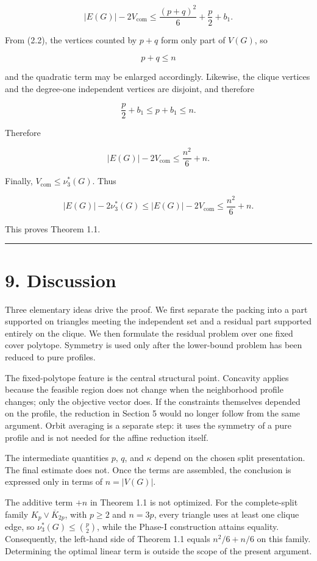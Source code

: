 \documentclass[
  11pt,
]{article}
\begin{document}
\[
|E(G)|-2V_{\mathrm{com}}
\le
\frac{(p+q)^2}{6}+\frac p2+b_1.
\tag{8.3}
\]

From (2.2), the vertices counted by \(p+q\) form only part of \(V(G)\),
so

\[
p+q\le n
\]

and the quadratic term may be enlarged accordingly. Likewise, the clique
vertices and the degree-one independent vertices are disjoint, and
therefore

\[
\frac p2+b_1
\le
p+b_1
\le
n.
\]

Therefore

\[
|E(G)|-2V_{\mathrm{com}}
\le
\frac{n^2}{6}+n.
\tag{8.4}
\]

Finally, \(V_{\mathrm{com}}\le\nu_3^*(G)\). Thus

\[
|E(G)|-2\nu_3^*(G)
\le
|E(G)|-2V_{\mathrm{com}}
\le
\frac{n^2}{6}+n.
\]

This proves Theorem 1.1.

\begin{center}\rule{0.5\linewidth}{0.5pt}\end{center}

\section{9. Discussion}\label{discussion}

Three elementary ideas drive the proof. We first separate the packing
into a part supported on triangles meeting the independent set and a
residual part supported entirely on the clique. We then formulate the
residual problem over one fixed cover polytope. Symmetry is used only
after the lower-bound problem has been reduced to pure profiles.

The fixed-polytope feature is the central structural point. Concavity
applies because the feasible region does not change when the
neighborhood profile changes; only the objective vector does. If the
constraints themselves depended on the profile, the reduction in Section
5 would no longer follow from the same argument. Orbit averaging is a
separate step: it uses the symmetry of a pure profile and is not needed
for the affine reduction itself.

The intermediate quantities \(p\), \(q\), and \(\kappa\) depend on the
chosen split presentation. The final estimate does not. Once the terms
are assembled, the conclusion is expressed only in terms of
\(n=|V(G)|\).

The additive term \(+n\) in Theorem 1.1 is not optimized. For the
complete-split family \(K_p\vee\overline{K}_{2p}\), with \(p\ge2\) and
\(n=3p\), every triangle uses at least one clique edge, so
\(\nu_3^*(G)\le\binom p2\), while the Phase-I construction attains
equality. Consequently, the left-hand side of Theorem 1.1 equals
\(n^2/6+n/6\) on this family. Determining the optimal linear term is
outside the scope of the present argument.
\end{document}
